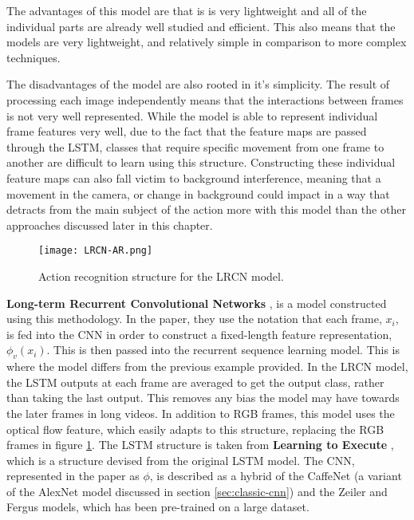 The advantages of this model are that is is very lightweight and all of the individual parts are already well studied and efficient. This also means that the models are very lightweight, and relatively simple in comparison to more complex techniques.

The disadvantages of the model are also rooted in it's simplicity. The result of processing each image independently means that the interactions between frames is not very well represented. While the model is able to represent individual frame features very well, due to the fact that the feature maps are passed through the LSTM, classes that require specific movement from one frame to another are difficult to learn using this structure. Constructing these individual feature maps can also fall victim to background interference, meaning that a movement in the camera, or change in background could impact in a way that detracts from the main subject of the action more with this model than the other approaches discussed later in this chapter.

\begin{figure}[ht]
	\texttt{[image: LRCN-AR.png]}
	\centering
	\caption{Action recognition structure for the LRCN model. \cite{LRCNS}}
	\label{fig:lrcn-ar}
\end{figure}

\textbf{Long-term Recurrent Convolutional Networks} \cite{LRCNS}, is a model constructed using this methodology. In the paper, they use the notation that each frame, $x_{i}$, is fed into the CNN in order to construct a fixed-length feature representation, $\phi_{v}(x_{i})$. This is then passed into the recurrent sequence learning model. This is where the model differs from the previous example provided. In the LRCN model, the LSTM outputs at each frame are averaged to get the output class, rather than taking the last output. This removes any bias the model may have towards the later frames in long videos. In addition to RGB frames, this model uses the optical flow feature, which easily adapts to this structure, replacing the RGB frames in figure \ref{fig:lrcn-ar}. The LSTM structure is taken from \textbf{Learning to Execute} \cite{LSTM-2015}, which is a structure devised from the original LSTM model. The CNN, represented in the paper as $\phi$, is described as a hybrid of the CaffeNet \cite{caffenet} (a variant of the AlexNet \cite{alexnet} model discussed in section \ref{sec:classic-cnn}) and the Zeiler and Fergus \cite{zeilerfergus} models, which has been pre-trained on a large dataset.

